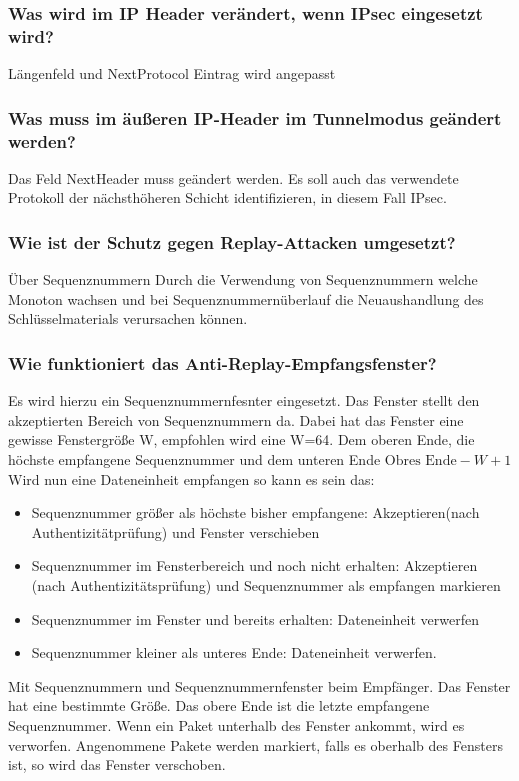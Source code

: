 	\subsubsection{Was wird im IP Header verändert, wenn IPsec eingesetzt wird?}
	Längenfeld und NextProtocol Eintrag wird angepasst %
	\subsubsection{Was muss im äußeren IP-Header im Tunnelmodus geändert werden?}
	Das Feld NextHeader muss geändert werden. Es soll auch das verwendete Protokoll der nächsthöheren Schicht identifizieren, in diesem Fall IPsec.
	
	\subsubsection{Wie ist der Schutz gegen Replay-Attacken umgesetzt?}
	Über Sequenznummern %
	Durch die Verwendung von Sequenznummern welche Monoton wachsen und bei Sequenznummernüberlauf die Neuaushandlung des Schlüsselmaterials verursachen können.
	\subsubsection{Wie funktioniert das Anti-Replay-Empfangsfenster?}
	Es wird hierzu ein Sequenznummernfesnter eingesetzt. Das Fenster stellt den akzeptierten Bereich von Sequenznummern da.  Dabei hat das Fenster eine gewisse Fenstergröße W, empfohlen wird eine W=64. Dem oberen Ende, die höchste empfangene Sequenznummer und dem unteren Ende $\text{Obres Ende} -W +1$
	\newline
	Wird nun eine Dateneinheit empfangen so kann es sein das:
	\begin{itemize}
		\item Sequenznummer größer als höchste bisher empfangene: Akzeptieren(nach Authentizitätprüfung) und Fenster verschieben
		\item Sequenznummer im Fensterbereich und noch nicht erhalten: Akzeptieren (nach Authentizitätsprüfung) und Sequenznummer als empfangen markieren
		\item Sequenznummer im Fenster und bereits erhalten: Dateneinheit verwerfen
		\item Sequenznummer kleiner als unteres Ende: Dateneinheit verwerfen. 
	\end{itemize}
	
	Mit Sequenznummern und Sequenznummernfenster beim Empfänger.
	Das Fenster hat eine bestimmte Größe. Das obere Ende ist die letzte empfangene Sequenznummer. Wenn ein Paket unterhalb des Fenster ankommt, wird es verworfen. Angenommene Pakete werden markiert, falls es oberhalb des Fensters ist, so wird das Fenster verschoben.
